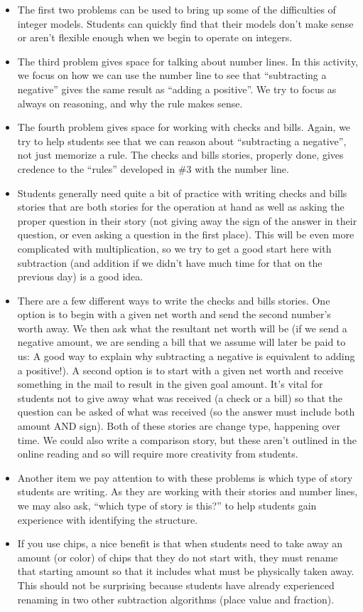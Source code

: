\documentclass[nooutcomes,noauthor,handout]{ximera}
\begin{document}
\begin{instructorNotes}
\begin{itemize}
    \item The first two problems can be used to bring up some of the difficulties of integer models.  Students can quickly find that their models don't make sense or aren't flexible enough when we begin to operate on integers.
    \item The third problem gives space for talking about number lines.  In this activity, we focus on how we can use the number line to see that ``subtracting a negative'' gives the same result as ``adding a positive''.  We try to focus as always on reasoning, and why the rule makes sense.
    \item The fourth problem gives space for working with checks and bills.  Again, we try to help students see that we can reason about ``subtracting a negative'', not just memorize a rule.  The checks and bills stories, properly done, gives credence to the ``rules'' developed in \#3 with the number line. 
    \item Students generally need quite a bit of practice with writing checks and bills stories that are both stories for the operation at hand as well as asking the proper question in their story (not giving away the sign of the answer in their question, or even asking a question in the first place).  This will be even more complicated with multiplication, so we try to get a good start here with subtraction (and addition if we didn't have much time for that on the previous day) is a good idea.
    \item There are a few different ways to write the checks and bills stories. One option is to begin with a given net worth and send the second number's worth away.  We then ask what the resultant net worth will be (if we send a negative amount, we are sending a bill that we assume will later be paid to us:  A good way to explain why subtracting a negative is equivalent to adding a positive!). A second option is to start with a given net worth and receive something in the mail to result in the given goal amount.  It's vital for students not to give away what was received (a check or a bill) so that the question can be asked of what was received (so the answer must include both amount AND sign). Both of these stories are change type, happening over time. We could also write a comparison story, but these aren't outlined in the online reading and so will require more creativity from students.
    \item Another item we pay attention to with these problems is which type of story students are writing.  As they are working with their stories and number lines, we may also ask, ``which type of story is this?'' to help students gain experience with identifying the structure.
    \item  If you use chips, a nice benefit is that when students need to take away an amount (or color) of chips that they do not start with, they must rename that starting amount so that it includes what must be physically taken away.  This should not be surprising because students have already experienced renaming in two other subtraction algorithms (place value and fraction).
\end{itemize}



\end{instructorNotes}
\end{document}
